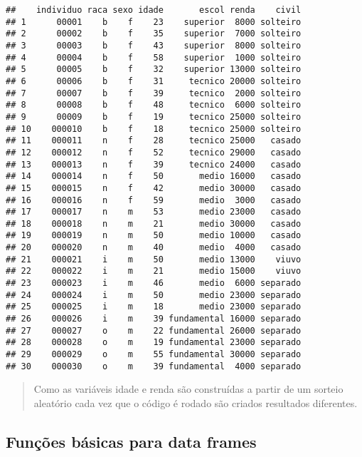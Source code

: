 \documentclass[]{book}
\theoremstyle{definition}
\theoremstyle{definition}
\theoremstyle{definition}
\theoremstyle{remark}
\begin{document}
\begin{verbatim}
##    individuo raca sexo idade       escol renda    civil
## 1      00001    b    f    23    superior  8000 solteiro
## 2      00002    b    f    35    superior  7000 solteiro
## 3      00003    b    f    43    superior  8000 solteiro
## 4      00004    b    f    58    superior  1000 solteiro
## 5      00005    b    f    32    superior 13000 solteiro
## 6      00006    b    f    31     tecnico 20000 solteiro
## 7      00007    b    f    39     tecnico  2000 solteiro
## 8      00008    b    f    48     tecnico  6000 solteiro
## 9      00009    b    f    19     tecnico 25000 solteiro
## 10    000010    b    f    18     tecnico 25000 solteiro
## 11    000011    n    f    28     tecnico 25000   casado
## 12    000012    n    f    52     tecnico 29000   casado
## 13    000013    n    f    39     tecnico 24000   casado
## 14    000014    n    f    50       medio 16000   casado
## 15    000015    n    f    42       medio 30000   casado
## 16    000016    n    f    59       medio  3000   casado
## 17    000017    n    m    53       medio 23000   casado
## 18    000018    n    m    21       medio 30000   casado
## 19    000019    n    m    50       medio 10000   casado
## 20    000020    n    m    40       medio  4000   casado
## 21    000021    i    m    50       medio 13000    viuvo
## 22    000022    i    m    21       medio 15000    viuvo
## 23    000023    i    m    46       medio  6000 separado
## 24    000024    i    m    50       medio 23000 separado
## 25    000025    i    m    18       medio 23000 separado
## 26    000026    i    m    39 fundamental 16000 separado
## 27    000027    o    m    22 fundamental 26000 separado
## 28    000028    o    m    19 fundamental 23000 separado
## 29    000029    o    m    55 fundamental 30000 separado
## 30    000030    o    m    39 fundamental  4000 separado
\end{verbatim}

\begin{quote}
Como as variáveis idade e renda são construídas a partir de um sorteio aleatório cada vez que o código é rodado são criados resultados diferentes.
\end{quote}

\hypertarget{funuxe7uxf5es-buxe1sicas-para-data-frames}{%
\subsection{Funções básicas para data frames}\label{funuxe7uxf5es-buxe1sicas-para-data-frames}}
\end{document}

